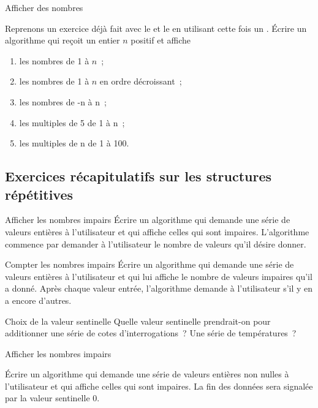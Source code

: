 		\begin{Exercice}{Afficher des nombres}

			Reprenons un exercice déjà fait avec le \pc{\algorithmicwhile}
			et le \pc{\algorithmicfor}
			en utilisant cette fois un \pc{\algorithmicrepeat} \pc{\algorithmicwhile}.
			Écrire un algorithme qui reçoit un entier $n$ positif et affiche
			\begin{enumerate}[label=\alph*)]
				\item les nombres de 1 à $n$~;
				\item les nombres de 1 à $n$ en ordre décroissant~;
				\item les nombres de -n à n~;
				\item les multiples de 5 de 1 à n~;
				\item les multiples de n de 1 à 100.
			\end{enumerate}
		\end{Exercice}


		
\subsection{Exercices récapitulatifs sur les structures répétitives}
\bigskip

		\begin{Exercice}{Afficher les nombres impairs}
			Écrire un algorithme qui demande une série
			de valeurs entières à l’utilisateur
			et qui affiche celles qui sont impaires.
			L’algorithme commence par demander à l’utilisateur
			le nombre de valeurs qu’il désire donner.
		\end{Exercice}

		\begin{Exercice}{Compter les nombres impairs}
			Écrire un algorithme qui demande une série
			de valeurs entières à l’utilisateur
			et qui lui affiche le nombre de valeurs impaires
			qu’il a donné.
			Après chaque valeur entrée,
			l’algorithme demande à l’utilisateur s’il y en a encore d’autres.
		\end{Exercice}

		\begin{Exercice}{Choix de la valeur sentinelle}
			Quelle valeur sentinelle prendrait-on 
			pour additionner une série de cotes d’interrogations~? 
			Une série de températures~?
		\end{Exercice}

		\begin{Exercice}{Afficher les nombres impairs}

			Écrire un algorithme qui demande une série
			de valeurs entières non nulles à l’utilisateur
			et qui affiche celles qui sont impaires.
			La fin des données sera signalée 
			par la valeur sentinelle 0.
		\end{Exercice}

